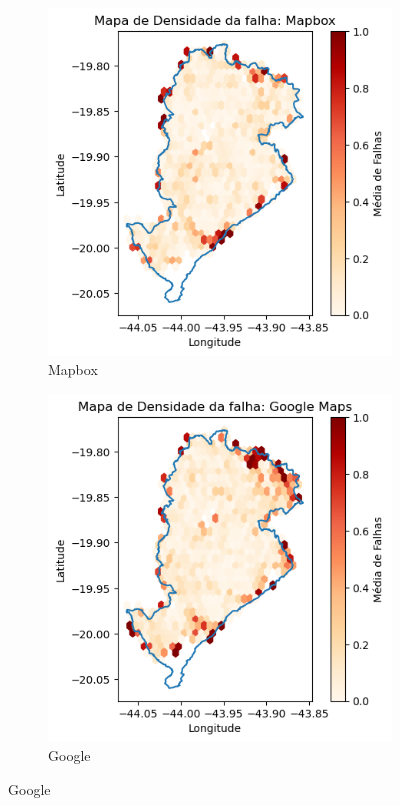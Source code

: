 \begin{figure}[ht]
  \centering
  \begin{subfigure}[b]{0.45\textwidth}
    \includegraphics[width=\textwidth]{Figuras/falhasMapboxBH.png}
    \caption{Mapbox}
    \label{fig:falhasmapboxB}
  \end{subfigure}
  \hfill
  \begin{subfigure}[b]{0.45\textwidth}
    \includegraphics[width=\textwidth]{Figuras/falhasGoogleBH.png}
    \caption{Google}
    \label{fig:falhasgoogleB}
  \end{subfigure}


\end{figure}
